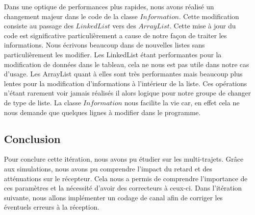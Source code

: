 Dans une optique de performances plus rapides, nous avons réalisé un changement majeur dans le code de la classe $Information$. Cette modification consiste au passage des $LinkedList$ vers des $ArrayList$. Cette mise à jour du code est significative particulièrement a cause de notre façon de traiter les informations. Nous écrivons beaucoup dans de nouvelles listes sans particulièrement les modifier. Les LinkedList étant performantes pour la modification de données dans le tableau, cela ne nous est pas utile dans notre cas d'usage. Les ArrayList quant à elles sont très performantes mais beaucoup plus lentes pour la modification d'informations à l'intérieur de la liste. Ces opérations n'étant rarement voir jamais réalisés il alors logique pour notre groupe de changer de type de liste. La classe $Information$ nous facilite la vie car, en effet cela ne nous demande que quelques lignes à modifier dans le programme.

\subsection{Conclusion}

Pour conclure cette itération, nous avons pu étudier sur les multi-trajets. Grâce aux simulations, nous avons pu comprendre l'impact du retard et des atténuations sur le récepteur. Cela nous a permis de comprendre l'importance de ces paramètres et la nécessité d'avoir des correcteurs à ceux-ci.
Dans l'itération suivante, nous allons implémenter un codage de canal afin de corriger les  éventuels erreurs à la réception. 